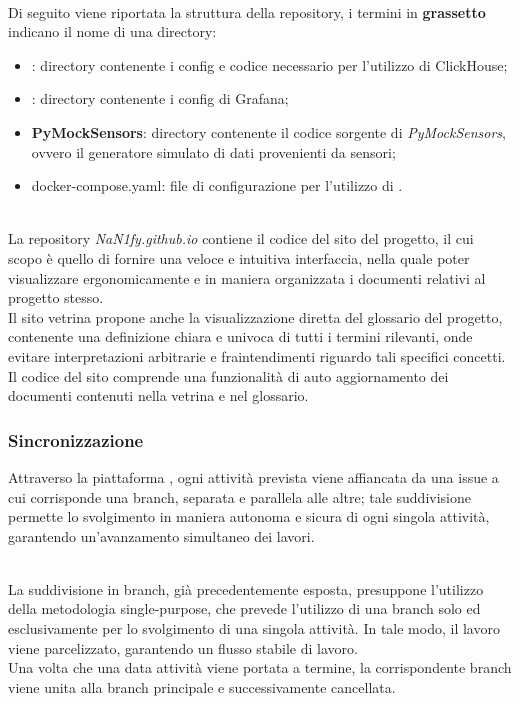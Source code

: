  \\
Di seguito viene riportata la struttura della repository, i termini in \textbf{grassetto} indicano il nome di una directory:
\begin{itemize}
    \item \textbf{}: directory contenente i config e codice necessario per l'utilizzo di ClickHouse;
    \item \textbf{}: directory contenente i config di Grafana;
    \item \textbf{PyMockSensors}: directory contenente il codice sorgente di \textit{PyMockSensors}, ovvero il generatore simulato di dati provenienti da sensori;
    \item docker-compose.yaml: file di configurazione per l'utilizzo di .
\end{itemize}

 \\
La repository \textit{NaN1fy.github.io} contiene il codice del sito del progetto, il cui scopo è quello di fornire una veloce e intuitiva interfaccia, nella quale poter visualizzare ergonomicamente e in maniera organizzata i documenti relativi al progetto stesso. \\
Il sito vetrina propone anche la visualizzazione diretta del glossario del progetto, contenente una definizione chiara e univoca di tutti i termini rilevanti, onde evitare interpretazioni arbitrarie e fraintendimenti riguardo tali specifici concetti. \\
Il codice del sito comprende una funzionalità di auto aggiornamento dei documenti contenuti nella vetrina e nel glossario.

\subsubsection{Sincronizzazione}

Attraverso la piattaforma , ogni attività prevista viene affiancata da una issue a cui corrisponde una branch, separata e parallela alle altre; tale suddivisione permette lo svolgimento in maniera autonoma e sicura di ogni singola attività, garantendo un'avanzamento simultaneo dei lavori.

 \\
La suddivisione in branch, già precedentemente esposta, presuppone l'utilizzo della metodologia single-purpose, che prevede l'utilizzo di una branch solo ed esclusivamente per lo svolgimento di una singola attività. In tale modo, il lavoro viene parcelizzato, garantendo un flusso stabile di lavoro. \\
Una volta che una data attività viene portata a termine, la corrispondente branch viene unita alla branch principale e successivamente cancellata.

